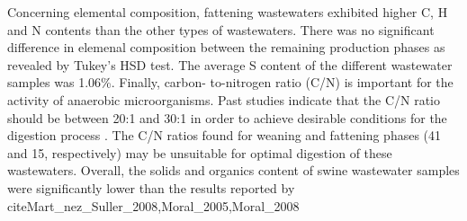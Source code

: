 Concerning elemental composition, fattening wastewaters exhibited higher C, H and N contents than the other types of wastewaters. There was no significant difference in elemenal composition between the remaining production phases as revealed by Tukey's HSD test. The average S content of the different wastewater samples was 1.06\%. Finally, carbon- to-nitrogen ratio (C/N) is important for the activity of anaerobic microorganisms. Past studies indicate that the C/N ratio should be between 20:1 and 30:1 in order to achieve desirable conditions for the digestion process \cite{1,Fricke_2007}. The C/N ratios found for weaning and fattening phases (41 and 15, respectively) may be unsuitable for optimal digestion of these wastewaters. Overall, the solids and organics content of swine wastewater samples were significantly lower than the results reported by cite{Mart_nez_Suller_2008,Moral_2005,Moral_2008}